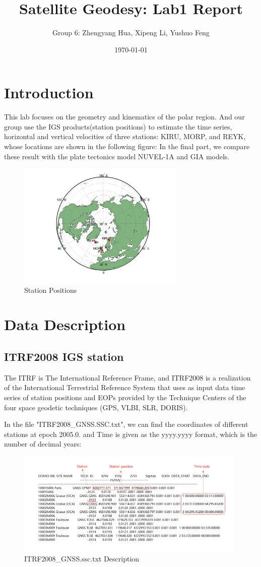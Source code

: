 \documentclass{article}
\title{Satellite Geodesy: Lab1 Report}
\author{Group 6: Zhengyang Hua, Xipeng Li, Yushuo Feng}
\date{\today}
\begin{document}
\maketitle
\tableofcontents

\section{Introduction}
This lab focuses on the geometry and kinematics of the polar region. 
And our group use the IGS products(station positions) to estimate the time series, horizontal and vertical velocities of three stations: KIRU, MORP, and REYK, whose locations are shown in the following figure:
In the final part, we compare these result with the plate tectonics model NUVEL-1A and GIA models.
\begin{figure}[H]
  \centering
  \includegraphics[width=8cm]{../result/point/Point.jpg}
  \captionsetup{skip=0.2cm}
  \caption{Station Positions}
  \label{Intro:station}
\end{figure}

\section{Data Description}
\subsection{ITRF2008 IGS station}
The ITRF is The International Reference Frame,  
and ITRF2008 is a realization of the International Terrestrial Reference System 
that uses as input data time series of station positions and EOPs provided by the Technique Centers of the four space geodetic techniques (GPS, VLBI, SLR, DORIS).

In the file "ITRF2008\_GNSS.SSC.txt", we can find the coordinates of different stations at epoch 2005.0.
 and Time is given as the yyyy.yyyy format, which is the number of decimal years:
\begin{figure}[H]
    \centering
    \includegraphics[width=11cm]{./source/ITRF2008.png}
    \caption{ITRF2008\_GNSS.ssc.txt Description}
    \label{fig:ITRF2008}
\end{figure}
\end{document}
